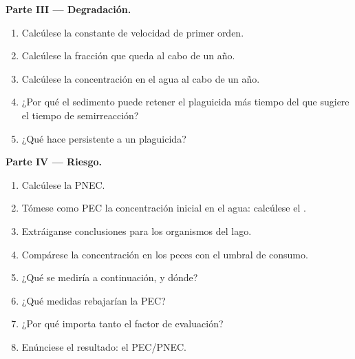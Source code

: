 \begin{problem}
\medskip\noindent\textbf{Parte III --- Degradación.}
\begin{enumerate}[resume]
  \item Calcúlese la constante de velocidad de primer orden.
  \item Calcúlese la fracción que queda al cabo de un año.
  \item Calcúlese la concentración en el agua al cabo de un año.
  \item ¿Por qué el sedimento puede retener el plaguicida más tiempo del que sugiere el tiempo de semirreacción?
  \item ¿Qué hace persistente a un plaguicida?
\end{enumerate}

\medskip\noindent\textbf{Parte IV --- Riesgo.}
\begin{enumerate}[resume]
  \item Calcúlese la PNEC.
  \item Tómese como PEC la concentración inicial en el agua: calcúlese el .
  \item Extráiganse conclusiones para los organismos del lago.
  \item Compárese la concentración en los peces con el umbral de consumo.
  \item ¿Qué se mediría a continuación, y dónde?
  \item ¿Qué medidas rebajarían la PEC?
  \item ¿Por qué importa tanto el factor de evaluación?
  \item Enúnciese el resultado: el  PEC/PNEC.
\end{enumerate}
\end{problem}
